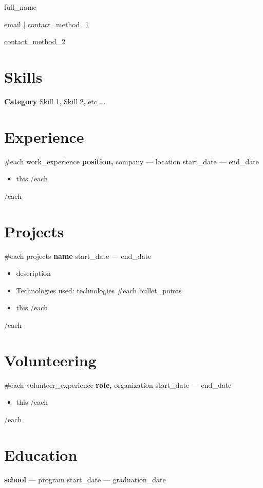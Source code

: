 \documentclass[11pt]{article}
\begin{document}
\centerline{\Huge {{full_name}}}

\vspace{5pt}

\centerline{\href{mailto:{{email}}}{{{email}}} | \href{{{contact_method_1}}}{{{contact_method_1}}} }\href{{{contact_method_2}}}{{{contact_method_2}}}

\vspace{-10pt}

\section*{Skills}
\textbf{Category} Skill 1, Skill 2, etc ...

\vspace{-10.5pt}

\section*{Experience}
{{#each work_experience}}
\textbf{{{position}},} {{{company}}} --- {{location}} \hfill {{start_date}} --- {{end_date}}
\vspace{-9pt}
\begin{itemize}
    {{#each bullet_points}}
    \item {{this}}
    {{/each}}
\end{itemize}

{{/each}}

\vspace{-18.5pt}

\section*{Projects}
{{#each projects}}
\textbf{{{name}}} \hfill {{start_date}} --- {{end_date}}
\vspace{-9pt}
\begin{itemize}
    \item {{description}}
    \item Technologies used: {{technologies}}
    {{#each bullet_points}}
    \item {{this}}
    {{/each}}
\end{itemize}

{{/each}}

\vspace{-18.5pt}

\section*{Volunteering}
{{#each volunteer_experience}}
\textbf{{{role}},} {{{organization}}} \hfill {{start_date}} --- {{end_date}}
\vspace{-9pt}
\begin{itemize}
    {{#each bullet_points}}
    \item {{this}}
    {{/each}}
\end{itemize}

{{/each}}

\vspace{-18.5pt}

\section*{Education}
\textbf{{{school}}} --- {{program}} \hfill {{start_date}} --- {{graduation_date}}
\end{document}

